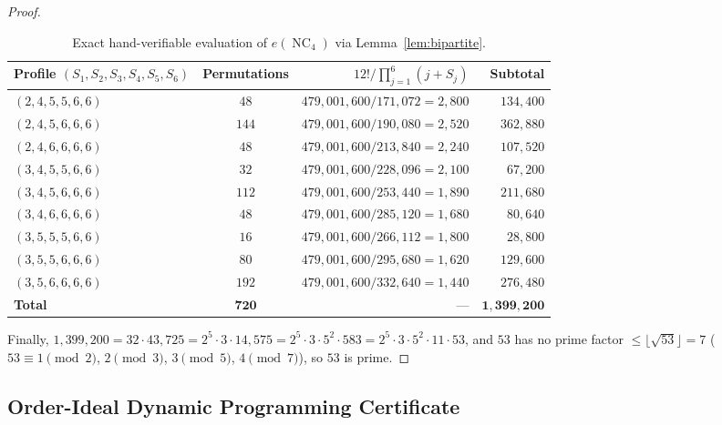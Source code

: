 \documentclass[11pt]{article}
\theoremstyle{definition}
\newcommand{\NC}{\operatorname{NC}}
\begin{document}
\begin{proof}
\begin{table}[ht]
\centering
\caption{Exact hand-verifiable evaluation of $e(\NC_4)$ via Lemma~\ref{lem:bipartite}.}
\label{tab:nc4}
\vspace{4pt}
\begin{tabular}{@{}lcrr@{}}
\toprule
Profile $(S_1,S_2,S_3,S_4,S_5,S_6)$ & Permutations & $12! / \prod_{j=1}^6 (j + S_j)$ & Subtotal \\
\midrule
$(2, 4, 5, 5, 6, 6)$ & $48$  & $479{,}001{,}600 / 171{,}072 = 2{,}800$ & $134{,}400$ \\
$(2, 4, 5, 6, 6, 6)$ & $144$ & $479{,}001{,}600 / 190{,}080 = 2{,}520$ & $362{,}880$ \\
$(2, 4, 6, 6, 6, 6)$ & $48$  & $479{,}001{,}600 / 213{,}840 = 2{,}240$ & $107{,}520$ \\
$(3, 4, 5, 5, 6, 6)$ & $32$  & $479{,}001{,}600 / 228{,}096 = 2{,}100$ & $67{,}200$ \\
$(3, 4, 5, 6, 6, 6)$ & $112$ & $479{,}001{,}600 / 253{,}440 = 1{,}890$ & $211{,}680$ \\
$(3, 4, 6, 6, 6, 6)$ & $48$  & $479{,}001{,}600 / 285{,}120 = 1{,}680$ & $80{,}640$ \\
$(3, 5, 5, 5, 6, 6)$ & $16$  & $479{,}001{,}600 / 266{,}112 = 1{,}800$ & $28{,}800$ \\
$(3, 5, 5, 6, 6, 6)$ & $80$  & $479{,}001{,}600 / 295{,}680 = 1{,}620$ & $129{,}600$ \\
$(3, 5, 6, 6, 6, 6)$ & $192$ & $479{,}001{,}600 / 332{,}640 = 1{,}440$ & $276{,}480$ \\
\midrule
\textbf{Total} & $\mathbf{720}$ & --- & $\mathbf{1{,}399{,}200}$ \\
\bottomrule
\end{tabular}
\end{table}

Finally, $1{,}399{,}200 = 32 \cdot 43{,}725 = 2^5 \cdot 3 \cdot 14{,}575 = 2^5 \cdot 3
\cdot 5^2 \cdot 583 = 2^5 \cdot 3 \cdot 5^2 \cdot 11 \cdot 53$, and $53$ has no prime
factor $\le \lfloor\sqrt{53}\rfloor = 7$ ($53 \equiv 1 \pmod 2$, $2 \pmod 3$, $3 \pmod 5$,
$4 \pmod 7$), so $53$ is prime.
\end{proof}

\subsection{Order-Ideal Dynamic Programming Certificate}
\end{document}
